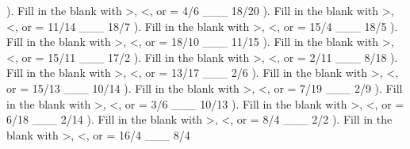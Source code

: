 \documentclass{article}%
\begin{document}
). Fill in the blank with >, <, or = 4/6 \_\_\_ 18/20%
\newline%
\newline%
). Fill in the blank with >, <, or = 11/14 \_\_\_ 18/7%
\newline%
\newline%
). Fill in the blank with >, <, or = 15/4 \_\_\_ 18/5%
\newline%
\newline%
). Fill in the blank with >, <, or = 18/10 \_\_\_ 11/15%
\newline%
\newline%
). Fill in the blank with >, <, or = 15/11 \_\_\_ 17/2%
\newline%
\newline%
). Fill in the blank with >, <, or = 2/11 \_\_\_ 8/18%
\newline%
\newline%
). Fill in the blank with >, <, or = 13/17 \_\_\_ 2/6%
\newline%
\newline%
). Fill in the blank with >, <, or = 15/13 \_\_\_ 10/14%
\newline%
\newline%
). Fill in the blank with >, <, or = 7/19 \_\_\_ 2/9%
\newline%
\newline%
). Fill in the blank with >, <, or = 3/6 \_\_\_ 10/13%
\newline%
\newline%
). Fill in the blank with >, <, or = 6/18 \_\_\_ 2/14%
\newline%
\newline%
). Fill in the blank with >, <, or = 8/4 \_\_\_ 2/2%
\newline%
\newline%
). Fill in the blank with >, <, or = 16/4 \_\_\_ 8/4%
\newline%
\end{document}
